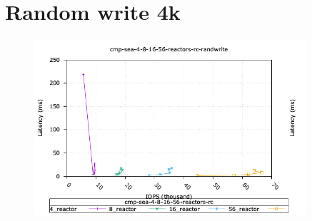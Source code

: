 %

\section{Random write 4k}

\begin{figure}[ht!]
  \centering
  \includegraphics[width=0.9\textwidth]{cmp_sea_4_8_16_56_reactors_rc_randwrite_iops_vs_lat.png}
\end{figure}

\newpage
\pagebreak

